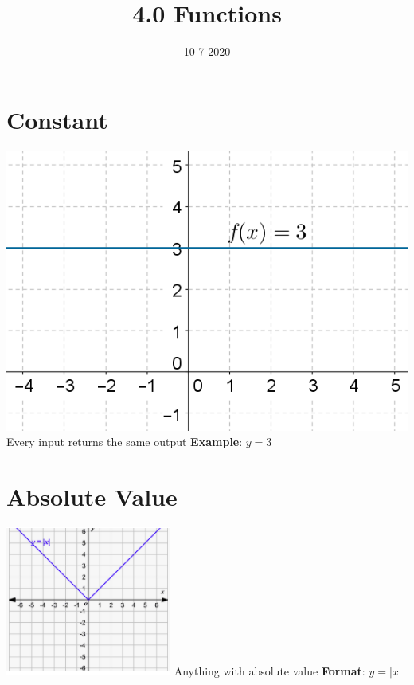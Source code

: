 \documentclass{article}
\begin{document}
	
	\setlength{\droptitle}{-5em}
	\title{4.0 Functions}
	\date{10-7-2020}
	\author{}
	\maketitle
	
	\section{Constant}
	\includegraphics[scale=0.5]{pics/constfunc.png}
	\newline \newline
	Every input returns the same output
	\newline \textbf{Example}: $y = 3$
	
	\section{Absolute Value}
	\includegraphics[scale=0.6]{pics/absvfunc.png}
	\newline \newline
	Anything with absolute value
	\newline \textbf{Format}: $y = |x|$
	
\end{document}
